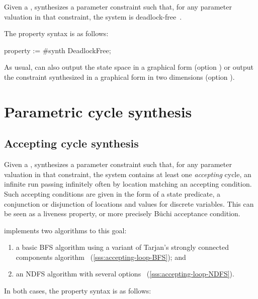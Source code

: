 Given a \NIPTA{}, \PDFC{} synthesizes a parameter constraint such that, for any parameter valuation in that constraint, the system is deadlock-free~\cite{Andre16}.

The property syntax is as follows:

\begin{IMITATORproperty}
property := #synth DeadlockFree;
\end{IMITATORproperty}

As usual, \imitator{} can also
output the state space in a graphical form (option )
or
output the constraint synthesized in a graphical form in two dimensions (option ).


\section{Parametric cycle synthesis}\label{section:algorithm:LoopSynth}


\subsection{Accepting cycle synthesis}\label{ss:accepting-loop}
Given a \NIPTA{}, \imitator{} synthesizes a parameter constraint such that, for any parameter valuation in that constraint, the system contains at least one \emph{accepting} cycle, \ie{} an infinite run passing infinitely often by location matching an accepting condition.
Such accepting conditions are given in the form of a state predicate, \ie{} a conjunction or disjunction of locations and values for discrete variables.
This can be seen as a liveness property, or more precisely Büchi acceptance condition.

\imitator{} implements two algorithms to this goal:
\begin{enumerate}
	\item a basic BFS algorithm using a variant of Tarjan's strongly connected components algorithm~\cite{AAPP21} (\cref{sss:accepting-loop-BFS}); and
	\item an NDFS algorithm with several options~\cite{NPP18,AAPP21} (\cref{sss:accepting-loop-NDFS}).
\end{enumerate}

In both cases, the property syntax is as follows:

